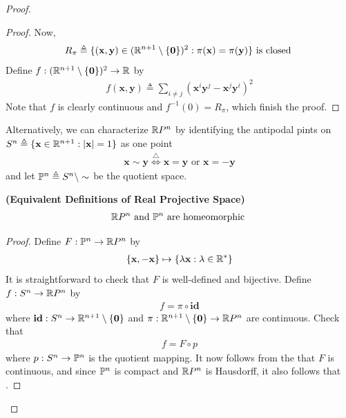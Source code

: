 \documentclass{report}
\begin{document}
\begin{proof}
\begin{proof}
Now, 
 \begin{align*}
R_\pi \triangleq \set{(\textbf{x},\textbf{y})\in (\R^{n+1}\setminus \set{\textbf{0}})^2:\pi (\textbf{x})= \pi (\textbf{y})}\text{ is closed }
\end{align*}
Define $f:(\R^{n+1}\setminus \set{\textbf{0}})^2\rightarrow \R$ by 
\begin{align*}
f(\textbf{x},\textbf{y})\triangleq \sum_{i\neq j} (\textbf{x}^i\textbf{y}^j-\textbf{x}^j \textbf{y}^i)^2
\end{align*}
Note that $f$ is clearly continuous and $f^{-1}(0)=R_\pi$, which finish the proof.
\end{proof}
\begin{mdframed}
Alternatively, we can characterize $\R P^n$ by identifying the antipodal pints on $S^n\triangleq \set{\textbf{x}\inr^{n+1}:\abso{\textbf{x}}=1}$ as one point 
\begin{align*}
\textbf{x}\sim \textbf{y}\overset{\triangle}{\iff } \textbf{x}=\textbf{y}\text{ or }\textbf{x}=-\textbf{y}
\end{align*}
and let $\P^n\triangleq S^n\setminus \sim $ be the quotient space.
\end{mdframed}
\begin{theorem}
\label{RPnhom}
\textbf{(Equivalent Definitions of Real Projective Space)} 
\begin{align*}
\RP^n\text{ and }\P^n\text{ are homeomorphic }
\end{align*}
\end{theorem}
\begin{proof}
Define $F:\P^n\rightarrow \RP^n$ by 
\begin{align*}
\set{\textbf{x},-\textbf{x}}\mapsto \set{\ld  \textbf{x}:\ld \inr^*}
\end{align*}
It is straightforward to check that $F$ is well-defined and bijective. Define $f:S^n \rightarrow \R P^n$ by 
\begin{align*}
f= \pi \circ \textbf{id}
\end{align*}
where $\textbf{id}:S^n \rightarrow \R^{n+1}\setminus \set{\textbf{0}}$ and $\pi:\R^{n+1}\setminus \set{\textbf{0}}\rightarrow \R P^n$ are continuous. Check that  
\begin{align*}
f=F\circ p
\end{align*}
where $p:S^n\rightarrow \P^n$ is the quotient mapping. It now follows from the  that $F$ is continuous, and since $\P^n$ is compact and  $\R P^n$ is Hausdorff,  it also follows that  . 

\end{proof}
\end{proof}
\end{document}
